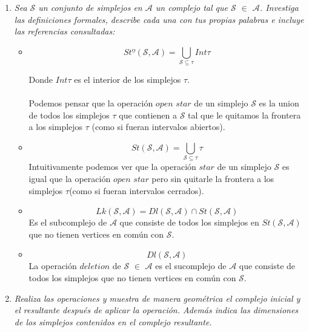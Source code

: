 \documentclass{article}
\begin{document}
\begin{enumerate}
  \item{
      \textsl{
    Sea $\mathcal{S}$ un conjunto de simplejos en $\mathcal{A}$ un
    complejo tal que $\mathcal{S}$ $\in$ $\mathcal{A}$. Investiga las
    definiciones formales, describe cada una con tus propias palabras
    e incluye las referencias consultadas:
    }
    \begin{itemize}
      
    \item{
          \[
           Stº(\mathcal{S}, \mathcal{A}) =  \bigcup_{\mathcal{S}
             \subseteq \tau} Int \tau 
          \]

          Donde $Int\tau$ es el interior de los simplejos $\tau$.\\\\
          Podemos pensar que la operación $open$ $star$ de un simplejo
          $\mathcal{S}$ es la union de
          todos los simplejos $\tau$ que contienen a $\mathcal{S}$
          tal que le quitamos la frontera a los simplejos $\tau$
          (como si fueran intervalos abiertos).
      }
      
    \item{
        \[
           St(\mathcal{S}, \mathcal{A}) =  \bigcup_{\mathcal{S}
             \subseteq \tau} \tau 
           \]
           Intuitivamente podemos ver que la operación $star$ de un
           simplejo $\mathcal{S}$ es igual que la operación $open$
           $star$ pero sin quitarle la frontera a los simplejos
           $\tau$(como si fueran intervalos cerrados).
         }

    \item{
        \[
        Lk(\mathcal{S}, \mathcal{A}) = Dl(\mathcal{S},\mathcal{A}) \cap
        St(\mathcal{S}, \mathcal{A})
        \]
        Es el subcomplejo de $\mathcal{A}$ que consiste de todos los
        simplejos en $St(\mathcal{S},\mathcal{A})$ que no tienen
        vertices en común con $\mathcal{S}$.
      }

    \item{
        \[
        Dl(\mathcal{S},\mathcal{A})
        \]
        La operación $deletion$ de $\mathcal{S}$ $\in$ $\mathcal{A}$
        es el sucomplejo de $\mathcal{A}$ que consiste de todos los
        simplejos que no tienen vertices en común con $\mathcal{S}$.
        }
    \end{itemize}

  
  }

\item{
    \textsl{
      Realiza las operaciones y muestra de manera geométrica el
      complejo inicial y el resultante después de aplicar la operación.
      Además indica las dimensiones de los simplejos contenidos en el
      complejo resultante.
    }

}
\end{enumerate}
\end{document}
